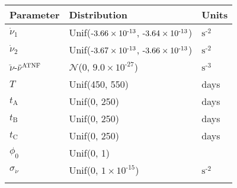 \begin{tabular}{lll} \hhline{===}
        Parameter & Distribution &  Units\\ \hline
$\dot{\nu}_{1}$ & Unif(${\text{\textrm{-}}3.66}\times 10^{\textrm{-}13}$, ${\text{\textrm{-}}3.64}\times 10^{\textrm{-}13}$) & $\mathrm{s}^{\textrm{-}2}$\\
$\dot{\nu}_{2}$ & Unif(${\text{\textrm{-}}3.67}\times 10^{\textrm{-}13}$, ${\text{\textrm{-}}3.66}\times 10^{\textrm{-}13}$) & $\mathrm{s}^{\textrm{-}2}$\\
$\ddot{\nu}$\textrm{-}$\ddot{\nu}^{\tiny\mathrm{ATNF}}$
 & $\mathcal{N}$(0, ${9.0}\times 10^{\textrm{-}27}$) & $\mathrm{s}^{\textrm{-}3}$\\
$T$ & Unif(450, 550) & days\\
$t_\mathrm{A}$ & Unif(0, 250) & days\\
$t_\mathrm{B}$ & Unif(0, 250) & days\\
$t_\mathrm{C}$ & Unif(0, 250) & days\\
$\phi_{0}$ & Unif(0, 1) & \\
$\sigma_{\dot{\nu}}$ & Unif(0, ${1}\times 10^{\textrm{-}15}$) & $\mathrm{s}^{\textrm{-}2}$\\
\hhline{===}
\end{tabular}